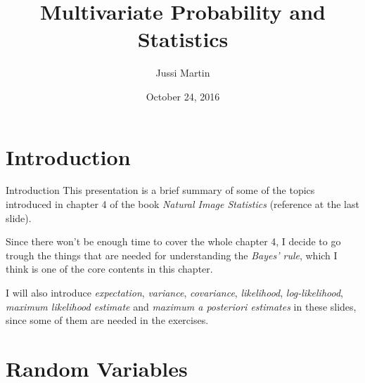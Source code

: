 \documentclass{beamer}
\title[Multivariate Probability and Statistics]{Multivariate Probability and Statistics}
\author{Jussi Martin}
\date{October 24, 2016}
\begin{document}
\begin{frame}
  \titlepage
\end{frame}


%
%
%
%
%

\section{Introduction}

\begin{frame}{Introduction}
  This presentation is a brief summary of some of the topics introduced in
  chapter 4 of the book \emph{Natural Image Statistics} (reference at
  the last slide).

  Since there won't be enough time to cover the whole chapter 4, I decide to go
  trough the things that are needed for understanding the \emph{Bayes' rule},
  which I think is one of the core contents in this chapter.

  I will also introduce \emph{expectation}, \emph{variance}, \emph{covariance},
  \emph{likelihood}, \emph{log-likelihood}, \emph{maximum likelihood estimate}
  and \emph{maximum a posteriori estimates} in these slides, since some of them
  are needed in the exercises.
\end{frame}

\section{Random Variables}
\end{document}

